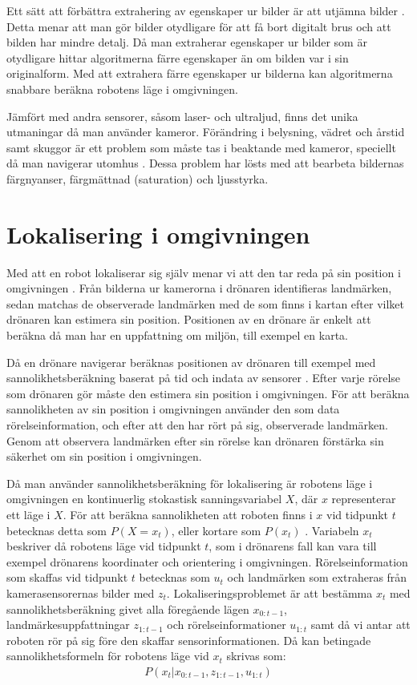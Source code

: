 Ett sätt att förbättra extrahering av egenskaper ur bilder är att utjämna bilder \citep{mapbuildingsift}. Detta menar att man gör bilder otydligare för att få bort digitalt brus och att bilden har mindre detalj. Då man extraherar egenskaper ur bilder som är otydligare hittar algoritmerna färre egenskaper än om bilden var i sin originalform. Med att extrahera färre egenskaper ur bilderna kan algoritmerna snabbare beräkna robotens läge i omgivningen.

Jämfört med andra sensorer, såsom laser- och ultraljud, finns det unika utmaningar då man använder kameror. Förändring i belysning, vädret och årstid samt skuggor är ett problem som måste tas i beaktande med kameror, speciellt då man navigerar utomhus \citep{982903}. Dessa problem har lösts med att bearbeta bildernas färgnyanser, färgmättnad (saturation) och ljusstyrka.

\section{Lokalisering i omgivningen} \label{lokalisering}

Med att en robot lokaliserar sig själv menar vi att den tar reda på sin position i omgivningen \citep{982903}. Från bilderna ur kamerorna i drönaren identifieras landmärken, sedan matchas de observerade landmärken med de som finns i kartan efter vilket drönaren kan estimera sin position. Positionen av en drönare är enkelt att beräkna då man har en uppfattning om miljön, till exempel en karta.

Då en drönare navigerar beräknas positionen av drönaren till exempel med sannolikhetsberäkning baserat på tid och indata av sensorer \citep{ProbabilisticRobotics}. Efter varje rörelse som drönaren gör måste den estimera sin position i omgivningen. För att beräkna sannolikheten av sin position i omgivningen använder den som data rörelseinformation, och efter att den har rört på sig, observerade landmärken. Genom att observera landmärken efter sin rörelse kan drönaren förstärka sin säkerhet om sin position i omgivningen. 

Då man använder sannolikhetsberäkning för lokalisering är robotens läge i omgivningen en kontinuerlig stokastisk sanningsvariabel $X$, där $x$ representerar ett läge i $X$. För att beräkna sannolikheten att roboten finns i $x$ vid tidpunkt $t$ betecknas detta som $P(X = x_t)$, eller kortare som $P(x_t)$ \citep{ProbabilisticRobotics}. Variabeln $x_t$ beskriver då robotens läge vid tidpunkt $t$, som i drönarens fall kan vara till exempel drönarens koordinater och orientering i omgivningen. Rörelseinformation som skaffas vid tidpunkt $t$ betecknas som $u_t$ och landmärken som extraheras från kamerasensorernas bilder med $z_t$. Lokaliseringsproblemet är att bestämma $x_t$ med sannolikhetsberäkning givet alla föregående lägen $x_{0:t-1}$, landmärkesuppfattningar $z_{1:t-1}$ och rörelseinformationer $u_{1:t}$ samt då vi antar att roboten rör på sig före den skaffar sensorinformationen. Då kan betingade sannolikhetsformeln för robotens läge vid $x_t$ skrivas som:
\begin{align}
    P( x_t | x_{0:t-1}, z_{1:t-1}, u_{1:t})
\end{align}

